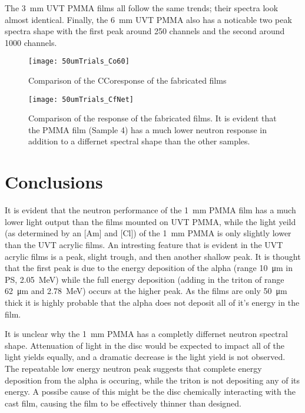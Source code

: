 \documentclass[draftcls,onecolumn]{IEEEtran}
\begin{document}
The \SI{3}{\mm} UVT PMMA films all follow the same trends; their spectra look almost identical.
Finally, the \SI{6}{\mm} UVT PMMA also has a noticable two peak spectra shape with the first peak around 250 channels and the second around 1000 channels.
\begin{figure}[h]
  \centering
  \texttt{[image: 50umTrials\_Co60]}
  \caption[Fabricated Film Comparison (Gamma)]{Comparison of the \iso[60]C{Co}response of the fabricated films}
  \label{fig:CompCo60}
\end{figure}
\begin{figure}
  \centering
  \texttt{[image: 50umTrials\_CfNet]}
  \caption[Fabricated Film Comparison (Neutron)]{Comparison of the  response of the fabricated films. It is evident that the PMMA film (Sample 4) has a much lower neutron response in addition to a differnet spectral shape than the other samples.}
  \label{fig:CompCf252}
\end{figure}
\section{Conclusions}
It is evident that the neutron performance of the \SI{1}{\mm} PMMA film has a much lower light output than the films mounted on UVT PMMA, while the light yeild (as determined by an [Am] and [Cl]) of the \SI{1}{\mm} PMMA is only slightly lower than the UVT acrylic films.
An intresting feature that is evident in the UVT acrylic films is a peak, slight trough, and then another shallow peak.
It is thought that the first peak is due to the energy deposition of the alpha (range \SI{10}{\um} in PS, \SI{2.05}{\MeV}) while the full energy deposition (adding in the triton of range \SI{62}{\um} and \SI{2.78}{\MeV}) occurs at the higher peak.
As the films are only \SI{50}{\um} thick it is highly probable that the alpha does not deposit all of it's energy in the film.

It is unclear why the \SI{1}{\mm} PMMA has a completly differnet neutron spectral shape.
Attenuation of light in the disc would be expected to impact all of the light yields equally, and a dramatic decrease is the light yield is not observed.
The repeatable low energy neutron peak suggests that complete energy deposition from the alpha is occuring, while the triton is not depositing any of its energy.
A possibe cause of this might be the disc chemically interacting with the cast film, causing the film to be effectively thinner than designed.
\end{document}

